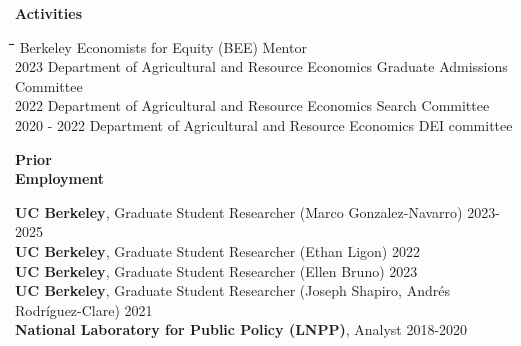 \documentclass[10pt, oneside]{article}
\newcommand\mytabs{\hspace*{1cm}\=\hspace{1cm}\=\hspace{1cm}\=\hspace{1cm}\=\hspace{1cm}\=\hspace{1cm}\=\hspace{1cm}\=\hspace{1cm}\=\hspace{1cm}\=\hspace{1cm}}
\newenvironment{mysec}[1][\mytabs]
  {\begin{tabbing}#1\kill\ignorespaces}
  {\end{tabbing}}
\begin{document}

\begin{minipage}[t]{0.1\linewidth}
\textbf{Activities}
\end{minipage}\hspace{0.05\linewidth}
\begin{minipage}[t]{0.8\linewidth}
\begin{mysec}
    2024 \>\> Berkeley Economists for Equity (BEE) Mentor\\ 
    2023 \>\> Department of Agricultural and Resource Economics Graduate Admissions Committee \\
    2022 \>\> Department of Agricultural and Resource Economics Search Committee \\
    2020 - 2022 \>\> Department of Agricultural and Resource Economics DEI committee \\


\end{mysec}
\end{minipage}\vspace{5mm}


\begin{minipage}[t]{0.1\linewidth}
\textbf{Prior \\ Employment}
\end{minipage}\hspace{0.05\linewidth}
\begin{minipage}[t]{0.8\linewidth}
\textbf{UC Berkeley}, Graduate Student Researcher (Marco Gonzalez-Navarro) \hfill 2023-2025 \\
\textbf{UC Berkeley}, Graduate Student Researcher (Ethan Ligon) \hfill 2022 \\
\textbf{UC Berkeley}, Graduate Student Researcher (Ellen Bruno) \hfill 2023 \\
\textbf{UC Berkeley}, Graduate Student Researcher (Joseph Shapiro, Andrés Rodríguez-Clare) \hfill 2021 \\
\textbf{National Laboratory for Public Policy (LNPP)}, Analyst \hfill 2018-2020 \\
\end{minipage}\vspace{5mm}

\begin{minipage}[t]{0.1\linewidth}
\textbf{}
\end{minipage}\hspace{0.05\linewidth}
\hspace{0.05\linewidth}
\begin{minipage}[t]{0.8\linewidth}


\end{minipage}\vspace{5mm}
\end{document}
